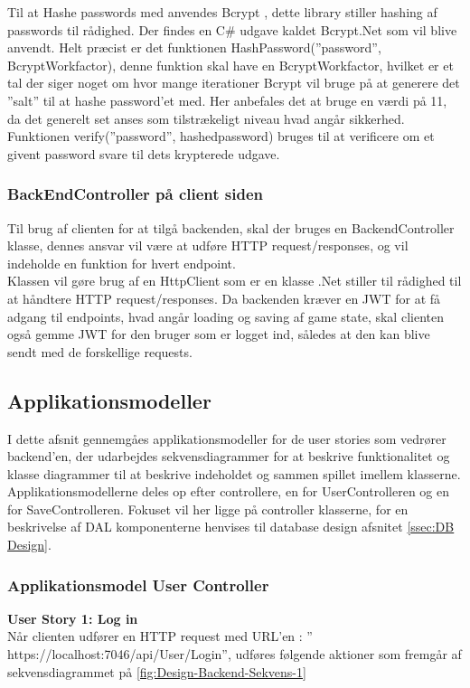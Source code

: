 Til at Hashe passwords med anvendes Bcrypt \cite{Bcrypt}, dette library stiller hashing af passwords til rådighed. Der findes en C\# udgave kaldet Bcrypt.Net  som vil blive anvendt. Helt præcist er det funktionen HashPassword(”password”, BcryptWorkfactor), denne funktion skal have en BcryptWorkfactor, hvilket er et tal der siger noget om hvor mange iterationer Bcrypt vil bruge på at generere det ”salt” til at hashe password’et med. Her anbefales det at bruge en værdi på 11, da det generelt set anses som tilstrækeligt niveau hvad angår sikkerhed.
Funktionen verify(”password”, hashedpassword) bruges til at verificere om et givent password svare til dets krypterede udgave.\\

\subsubsection{BackEndController på client siden}
Til brug af clienten for at tilgå backenden, skal der bruges en BackendController klasse, dennes ansvar vil være at udføre HTTP request/responses, og vil indeholde en funktion for hvert endpoint.\\
 
Klassen vil gøre brug af en HttpClient som er en klasse .Net stiller til rådighed til at håndtere HTTP request/responses. Da backenden kræver en JWT for at få adgang til endpoints, hvad angår loading og saving af game state, skal clienten også gemme JWT for den bruger som er logget ind, således at den kan blive sendt med de forskellige requests.


\subsection{Applikationsmodeller}
I dette afsnit gennemgåes applikationsmodeller for de user stories som vedrører backend'en, der udarbejdes sekvensdiagrammer for at beskrive funktionalitet og klasse diagrammer til at beskrive indeholdet og sammen spillet imellem klasserne. Applikationsmodellerne deles op efter controllere, en for UserControlleren og en for SaveControlleren. Fokuset vil her ligge på controller klasserne, for en beskrivelse af DAL komponenterne henvises til database design afsnitet \autoref{ssec:DB Design}.\\

\subsubsection{Applikationsmodel User Controller}
\textbf{User Story 1: Log in}\\
Når clienten udfører en HTTP request med URL’en : ” https://localhost:7046/api/User/Login”, udføres følgende aktioner som fremgår af sekvensdiagrammet på \autoref{fig:Design-Backend-Sekvens-1}\\ 

